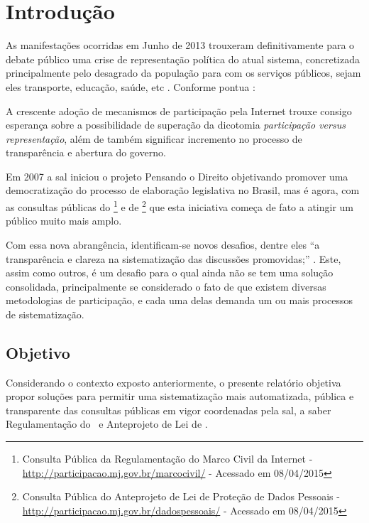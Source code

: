 \chapter{Introdução}
As manifestações ocorridas em Junho de 2013 trouxeram definitivamente para o debate público uma crise de representação política do atual sistema, concretizada principalmente pelo desagrado da população para com os serviços públicos, sejam eles transporte, educação, saúde, etc \cite{SANTANA2013}.
Conforme pontua :
\begin{citacao}
A crescente adoção de mecanismos de participação pela Internet trouxe consigo esperança sobre a possibilidade de superação da dicotomia \textit{participação versus representação}, além de também significar incremento no processo de transparência e abertura do governo.
\end{citacao}

Em 2007 a \gls{sal} iniciou o projeto Pensando o Direito objetivando promover uma democratização do processo de elaboração legislativa no Brasil, mas é agora, com as consultas públicas do \mc\footnote{Consulta Pública da Regulamentação do Marco Civil da Internet - \url{http://participacao.mj.gov.br/marcocivil/} - Acessado em 08/04/2015} e de \pdp\footnote{Consulta Pública do Anteprojeto de Lei de Proteção de Dados Pessoais - \url{http://participacao.mj.gov.br/dadospessoais/} - Acessado em 08/04/2015} que esta iniciativa começa de fato a atingir um público muito mais amplo.

Com essa nova abrangência, identificam-se novos desafios, dentre eles ``a transparência e clareza na sistematização das discussões promovidas;'' \cite{svab2014}. Este, assim como outros, é um desafio para o qual ainda não se tem uma solução consolidada, principalmente se considerado o fato de que existem diversas metodologias de participação, e cada uma delas demanda um ou mais processos de sistematização.

\section{Objetivo}
Considerando o contexto exposto anteriormente, o presente relatório objetiva propor soluções para permitir uma sistematização mais automatizada, pública e transparente das consultas públicas em vigor coordenadas pela \gls{sal}, a saber Regulamentação do \mc~e Anteprojeto de Lei de \pdp.

